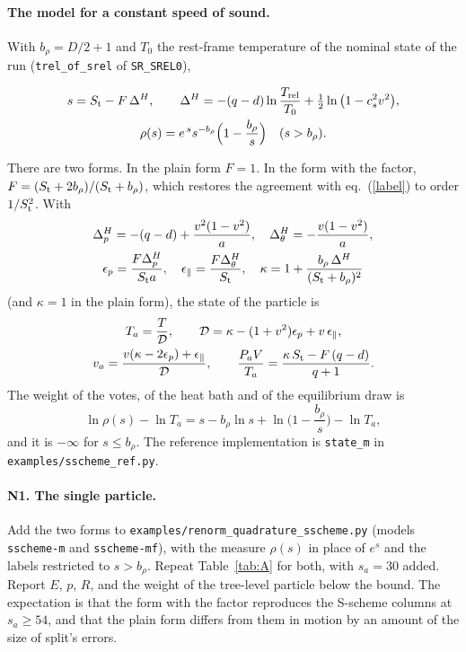 \documentclass[11pt,aps,preprint,nofootinbib,superscriptaddress,tightenlines]{revtex4-2}
\def\st{\begin{equation}}
\def\stp{\end{equation}}
\def\Eq#1{eq.~(\ref{#1})}
\let\oldparagraph\paragraph
\renewcommand{\paragraph}{\par\bigskip\oldparagraph}
\begin{document}
\paragraph{The model for a constant speed of sound.}  With $b_\rho=D/2+1$ and $T_0$ the rest-frame temperature of the nominal state of the run
(\texttt{trel\_of\_srel} of \texttt{SR\_SREL0}),
\begin{keyeq}
\st
\begin{gathered}
s=S_{\rm t}-F\,\Delta^H,\qquad \Delta^H=-(q-d)\ln\frac{T_{\rm rel}}{T_0}+\tfrac12\ln\big(1-c_s^2v^2\big),\\
\rho(s)=e^{\,s}s^{-b_\rho}\Big(1-\frac{b_\rho} s\Big)\quad(s>b_\rho) .
\end{gathered}
\label{amend}
\stp
\end{keyeq}
There are two forms.  In the plain form $F=1$.  In the form with the factor, $F=(S_{\rm t}+2b_\rho)/(S_{\rm t}+b_\rho)$, which restores the agreement
with \Eq{label} to order $1/S_{\rm t}^2$.  With
\st
\begin{gathered}
\Delta_p^H=-(q-d)+\frac{v^2(1-v^2)}{a},\quad \Delta_\theta^H=-\frac{v(1-v^2)}{a},\\
\epsilon_p=\frac{F\Delta_p^H}{S_{\rm t}a},\quad \epsilon_\parallel=\frac{F\Delta_\theta^H}{S_{\rm t}},\quad
\kappa=1+\frac{b_\rho\,\Delta^H}{(S_{\rm t}+b_\rho)^2}
\end{gathered}
\stp
(and $\kappa=1$ in the plain form), the state of the particle is
\st
\begin{gathered}
T_a=\frac{T}{\mathcal D},\qquad \mathcal D=\kappa-(1+v^2)\epsilon_p+v\,\epsilon_\parallel,\\
v_a=\frac{v(\kappa-2\epsilon_p)+\epsilon_\parallel}{\mathcal D},\qquad
\frac{P_aV}{T_a}=\frac{\kappa\,S_{\rm t}-F\,(q-d)}{q+1} .
\end{gathered}
\label{amendstate}
\stp
The weight of the votes, of the heat bath and of the equilibrium draw is
\st
\ln\rho(s)-\ln T_a=s-b_\rho\ln s+\ln\Big(1-\frac{b_\rho} s\Big)-\ln T_a ,
\label{amendweight}
\stp
and it is $-\infty$ for $s\le b_\rho$.  The reference implementation is \texttt{state\_m} in \nolinkurl{examples/sscheme_ref.py}.

\paragraph{N1. The single particle.}  Add the two forms to \nolinkurl{examples/renorm_quadrature_sscheme.py} (models \texttt{sscheme-m} and
\texttt{sscheme-mf}), with the measure $\rho(s)$ in place of $e^s$ and the labels restricted to $s>b_\rho$.  Repeat Table~\ref{tab:A} for both, with
$s_a=30$ added.  Report $E$, $p$, $R$, and the weight of the tree-level particle below the bound.  The expectation is that the form with the factor
reproduces the S-scheme columns at $s_a\ge54$, and that the plain form differs from them in motion by an amount of the size of split's errors.
\end{document}
